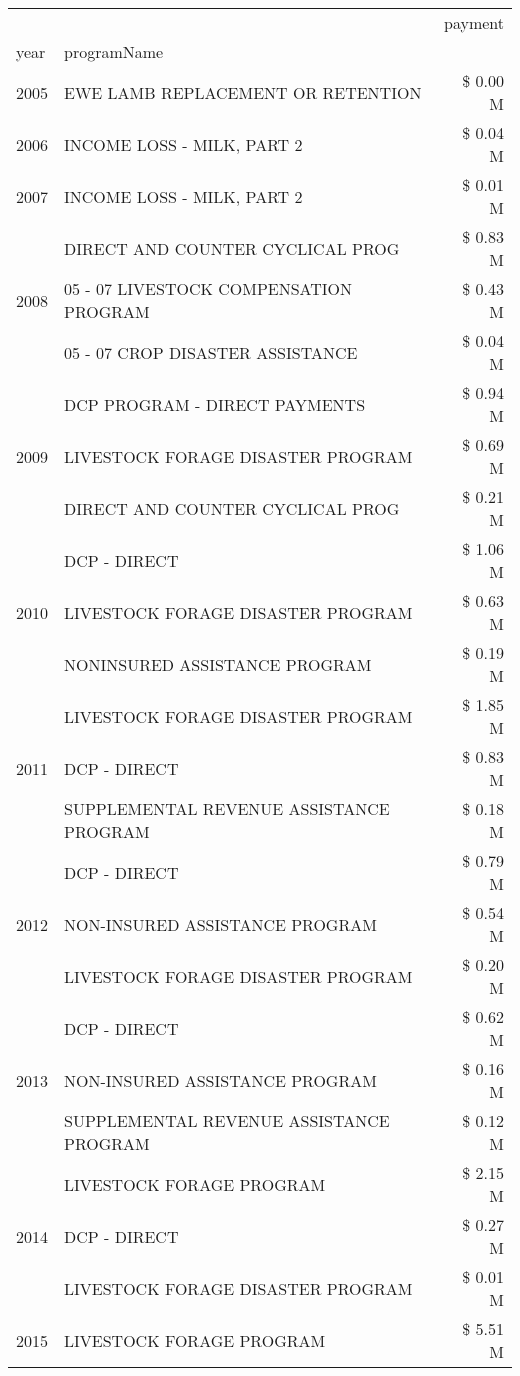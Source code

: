 \begin{tabular}{llr}
\toprule
 &  & payment \\
year & programName &  \\
\midrule
2005 & EWE LAMB REPLACEMENT OR RETENTION & \$ 0.00 M \\
\cline{1-3}
2006 & INCOME LOSS - MILK, PART 2 & \$ 0.04 M \\
\cline{1-3}
2007 & INCOME LOSS - MILK, PART 2 & \$ 0.01 M \\
\cline{1-3}
\multirow[t]{3}{*}{2008} & DIRECT AND COUNTER CYCLICAL PROG & \$ 0.83 M \\
 & 05 - 07 LIVESTOCK COMPENSATION PROGRAM & \$ 0.43 M \\
 & 05 - 07 CROP DISASTER ASSISTANCE & \$ 0.04 M \\
\cline{1-3}
\multirow[t]{3}{*}{2009} & DCP PROGRAM - DIRECT PAYMENTS & \$ 0.94 M \\
 & LIVESTOCK FORAGE DISASTER  PROGRAM & \$ 0.69 M \\
 & DIRECT AND COUNTER CYCLICAL PROG & \$ 0.21 M \\
\cline{1-3}
\multirow[t]{3}{*}{2010} & DCP - DIRECT & \$ 1.06 M \\
 & LIVESTOCK FORAGE DISASTER PROGRAM & \$ 0.63 M \\
 & NONINSURED ASSISTANCE PROGRAM & \$ 0.19 M \\
\cline{1-3}
\multirow[t]{3}{*}{2011} & LIVESTOCK FORAGE DISASTER PROGRAM & \$ 1.85 M \\
 & DCP - DIRECT & \$ 0.83 M \\
 & SUPPLEMENTAL REVENUE ASSISTANCE PROGRAM & \$ 0.18 M \\
\cline{1-3}
\multirow[t]{3}{*}{2012} & DCP - DIRECT & \$ 0.79 M \\
 & NON-INSURED ASSISTANCE PROGRAM & \$ 0.54 M \\
 & LIVESTOCK FORAGE DISASTER PROGRAM & \$ 0.20 M \\
\cline{1-3}
\multirow[t]{3}{*}{2013} & DCP - DIRECT & \$ 0.62 M \\
 & NON-INSURED ASSISTANCE PROGRAM & \$ 0.16 M \\
 & SUPPLEMENTAL REVENUE ASSISTANCE PROGRAM & \$ 0.12 M \\
\cline{1-3}
\multirow[t]{3}{*}{2014} & LIVESTOCK FORAGE PROGRAM & \$ 2.15 M \\
 & DCP - DIRECT & \$ 0.27 M \\
 & LIVESTOCK FORAGE DISASTER PROGRAM & \$ 0.01 M \\
\cline{1-3}
\multirow[t]{3}{*}{2015} & LIVESTOCK FORAGE PROGRAM & \$ 5.51 M \\

\end{tabular}
